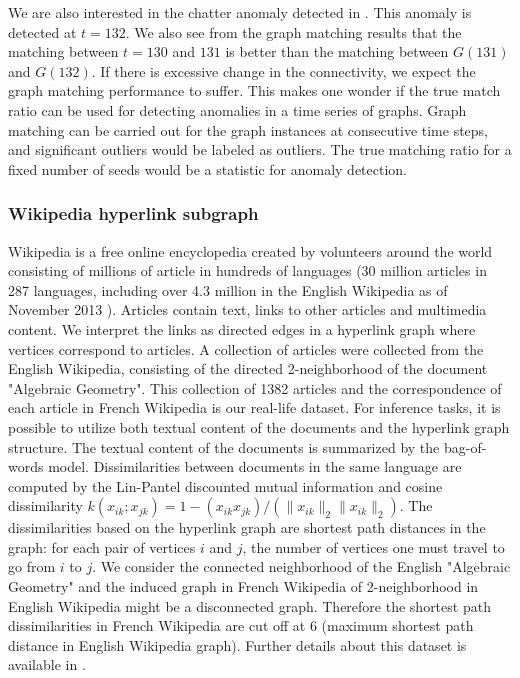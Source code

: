 \documentclass[12pt,oneside,final]{thesis}
\begin{document}
We are also interested in the chatter anomaly detected in \cite{EnronStudy}. This anomaly is detected at $t=132$. We also see from the graph matching results that the matching between $t=130$ and $131$ is better than the matching between $G(131)$ and $G(132)$. If there is excessive change in the connectivity, we expect the graph matching performance to suffer. This makes one wonder if the true match ratio can be used for detecting anomalies in a time series of graphs. Graph matching can be carried out for the graph instances at consecutive time steps, and significant outliers would be labeled as outliers. The true matching ratio  for a fixed number of seeds would be a statistic for anomaly detection. 

\subsubsection{Wikipedia hyperlink subgraph}

Wikipedia is a free online encyclopedia created by volunteers around the world consisting of millions of article in hundreds of languages (30 million articles in 287 languages, including over 4.3 million in the English Wikipedia as of November 2013 \cite{wikipedia}). Articles contain text, links to other articles and multimedia content. We interpret the links as directed edges in a hyperlink graph where vertices correspond to articles. A collection of articles were collected from the English Wikipedia, consisting of the
 directed 2-neighborhood of the document "Algebraic Geometry"\cite{wikiwebpage}. 
   This  collection of 1382 articles and the correspondence of each article in French 
Wikipedia is our real-life dataset. For inference tasks, it is possible to utilize both textual content of the documents and the hyperlink graph structure. The textual content of the documents is summarized by the bag-of-words model. Dissimilarities between documents  in the same language are computed by the Lin-Pantel discounted mutual information \cite{LinPantel,PantelLin}
 and cosine dissimilarity $k(x_{ik}; x_{jk}) = 1 - (x_{ik} x_{jk})/(\|x_{ik}\|_2\|x_{ik}\|_2)$. 
 The dissimilarities based on the hyperlink graph are shortest path distances in the graph:
 for each pair of vertices $i$ and $j$, the number of vertices one must travel to go from $i$ to $j$. We consider the connected neighborhood of the English  "Algebraic Geometry" and the induced graph in French Wikipedia of 2-neighborhood in English Wikipedia might be a disconnected graph. Therefore the shortest path dissimilarities in French Wikipedia are cut off at 6 (maximum shortest path distance in English Wikipedia graph).  Further details about this dataset is available in \cite{Zhiliang_disparate}.
 
\end{document}
